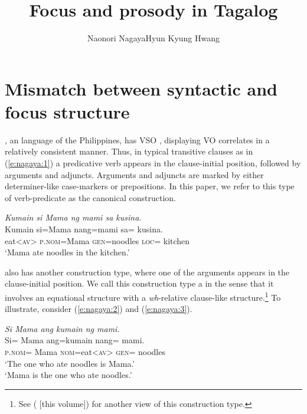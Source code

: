 \documentclass[output=paper]{langsci/langscibook}
\title{Focus and prosody in Tagalog}
\author{Naonori Nagaya\affiliation{Tokyo University of Foreign Studies}\lastand Hyun Kyung Hwang\affiliation{RIKEN Brain Science Institute}}
\begin{document}
\maketitle

\section{\label{s:nagaya:1}Mismatch between syntactic and focus structure}

, an  language of the Philippines, has VSO , displaying VO  correlates in a relatively consistent manner. Thus, in typical transitive clauses as in (\ref{e:nagaya:1}) a predicative verb appears in the clause-initial position, followed by arguments and adjuncts. Arguments and adjuncts are marked by either determiner-like case-markers or prepositions. In this paper, we refer to this type of verb-predicate  as the canonical construction.

\begin{exe}
		\ex\label{e:nagaya:1}\textit{Kumain si Mama ng mami sa kusina.}\\
		\gll K{\USSmaller}um{\USGreater}ain si=Mama {nang=mami\footnotemark} sa=  kusina.\\
		eat<\textsc{av}>  \textsc{p.nom}=Mama  \textsc{gen}=noodles  \textsc{loc}=  kitchen\\
		\glt ‘Mama ate noodles in the kitchen.’
\end{exe}


\noindent
{} also has another construction type, where one of the arguments appears in the clause-initial position. We call this construction type a  in the sense that it involves an equational  structure with a \textit{wh}-relative clause-like structure.\footnote{See 
  \citeauthor{Kaufman2009} (\citeyear*{Kaufman2009,Kaufman2018} [this volume])  for another view of this construction type.}
To illustrate, consider (\ref{e:nagaya:2}) and (\ref{e:nagaya:3}). 

\begin{exe}
	\ex\label{e:nagaya:2}\textit{Si Mama ang kumain ng mami.}\\
	\gll Si=    Mama    ang={\ob}k{\USSmaller}um{\USGreater}ain  nang=  mami{\cb}.\\
	\textsc{p.nom}=  Mama    \textsc{nom}=eat<\textsc{av}>  \textsc{gen}=  noodles\\
	\glt ‘The one who ate noodles is Mama.’\\
	\glt ‘Mama is the one who ate noodles.’
\end{exe}
\end{document}
